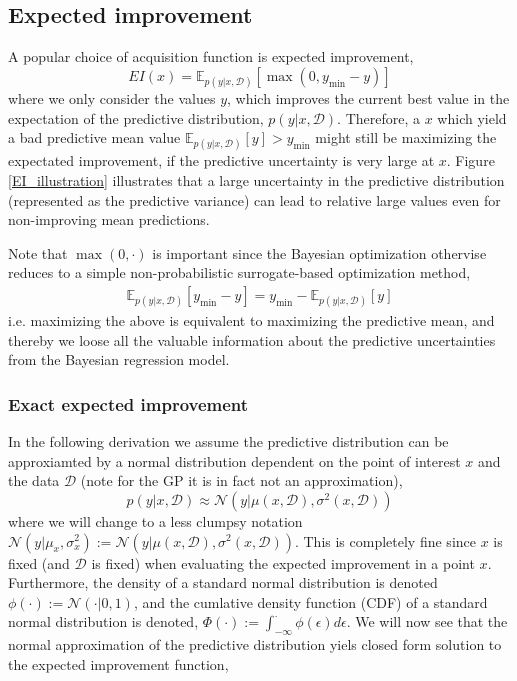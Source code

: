 \subsection{Expected improvement}
A popular choice of acquisition function is expected improvement, 
$$EI(x) = \mathbb{E}_{p(y|x,\mathcal{D})}[\max(0, y_{\min}-y)]$$ where we only consider the values
$y$, which improves the current best value in the expectation of the predictive distribution,
$p(y|x,\mathcal{D})$. Therefore, a $x$ which yield a bad predictive mean value
$\mathbb{E}_{p(y|x,\mathcal{D})}[y]> y_{\min}$ might still be maximizing the expectated improvement,
if the predictive uncertainty is very large at $x$. Figure \ref{EI_illustration} illustrates that a
large uncertainty in the predictive distribution (represented as the predictive variance) can lead
to relative large values even for non-improving mean predictions.


\begin{note2}    
    Note that $\max(0,\cdot)$ is important since the Bayesian optimization othervise reduces to
    a simple non-probabilistic surrogate-based optimization method,
    \begin{align*}
        \mathbb{E}_{p(y|x,\mathcal{D})}[y_{\min}-y] = y_{\min} - \mathbb{E}_{p(y|x,\mathcal{D})}[y]
    \end{align*}
    i.e. maximizing the above is equivalent to maximizing the predictive mean, and thereby we loose
    all the valuable information about the predictive uncertainties from the Bayesian regression model. 
\end{note2}

\subsubsection{Exact expected improvement} \label{ExactEI} 
In the following derivation we assume the
predictive distribution can be approxiamted by a normal distribution dependent on the point of
interest $x$ and the data $\mathcal{D}$ (note for the GP it is in fact not an approximation), 
$$p(y|x,\mathcal{D}) \approx \mathcal{N}(y|\mu(x,\mathcal{D}), \sigma^2(x,\mathcal{D}))$$ where we
will change to a less clumpsy notation $\mathcal{N}(y|\mu_x,
\sigma^2_x):=\mathcal{N}(y|\mu(x,\mathcal{D}), \sigma^2(x,\mathcal{D}))$. This is completely fine
since $x$ is fixed (and $\mathcal{D}$ is fixed) when evaluating the expected improvement in a point
$x$. %
Furthermore, the density of
a standard normal distribution is denoted $\phi(\cdot):=\mathcal{N}(\cdot | 0,1)$, and the cumlative
density function (CDF) of a standard normal distribution is denoted, $\Phi(\cdot) :=
\int_{-\infty}^{\cdot} \phi(\epsilon)d\epsilon$. We will now see that the normal approximation
of the predictive distribution yiels closed form solution to the expected improvement function, 

